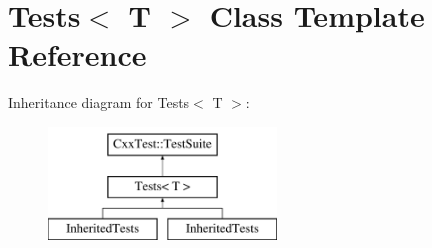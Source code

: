 \hypertarget{classTests}{\section{Tests$<$ T $>$ Class Template Reference}
\label{classTests}
}
Inheritance diagram for Tests$<$ T $>$\-:\begin{figure}[H]
\begin{center}
\leavevmode
\includegraphics[height=3.000000cm]{classTests}
\end{center}
\end{figure}
